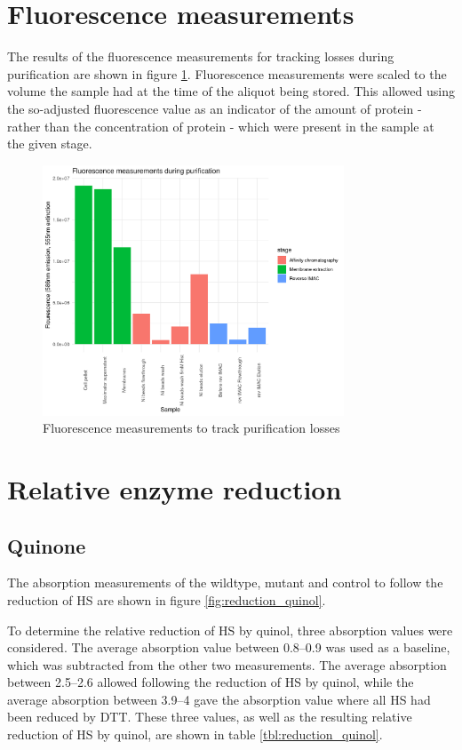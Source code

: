 \section{Fluorescence measurements}

The results of the fluorescence measurements for tracking losses during
purification are shown in figure \ref{fig:purification_fluorescence}.
Fluorescence measurements were scaled to the volume the sample had at the time
of the aliquot being stored. This allowed using the so-adjusted fluorescence
value as an indicator of the amount of protein - rather than the concentration
of protein - which were present in the sample at the given stage.

\begin{figure}
	\centering
	\includegraphics[width=0.8\textwidth]{img/purification_fluorescence.png}
	\caption{Fluorescence measurements to track purification losses}
	\label{fig:purification_fluorescence}
\end{figure}

\section{Relative enzyme reduction}

\subsection{Quinone}

The absorption measurements of the wildtype, mutant and control to follow the
reduction of HS are shown in figure \ref{fig:reduction_quinol}.

To determine the relative reduction of HS by quinol, three absorption values
were considered. The average absorption value between \SIrange{0.8}{0.9}{\min}
was used as a baseline, which was subtracted from the other two measurements.
The average absorption between \SIrange{2.5}{2.6}{\min} allowed following the
reduction of HS by quinol, while the average absorption between
\SIrange{3.9}{4}{\min} gave the absorption value where all HS had been reduced
by DTT. These three values, as well as the resulting relative reduction of HS
by quinol, are shown in table \ref{tbl:reduction_quinol}.


